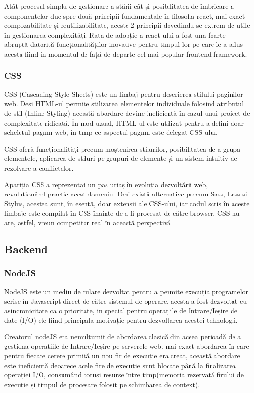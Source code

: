 \documentclass[12pt,a4paper,hidelinks]{report}
\theoremstyle{definition}
\theoremstyle{remark}
\begin{document}
Atât procesul simplu de gestionare a stării cât și
posibilitatea de îmbricare a componentelor duc spre două principii fundamentale în filosofia react,
mai exact compozabilitate și reutilizabilitate, aceste 2 principii dovedindu-se extrem de utile în gestionarea complexități.
Rata de adopție a react-ului a fost una foarte abruptă datorită funcționalităților inovative pentru timpul lor pe care le-a adus acesta
fiind în momentul de față de departe cel mai popular frontend framework.

\subsubsection{CSS}

CSS (Cascading Style Sheets) este un limbaj pentru descrierea stilului paginilor web. Deși HTML-ul permite stilizarea elementelor individuale folosind atributul de stil (Inline Styling) 
această abordare devine ineficientă în cazul unui proiect de complexitate ridicată. În mod uzual, HTML-ul este utilizat pentru a defini doar scheletul paginii web, 
în timp ce aspectul paginii este delegat CSS-ului. 

CSS oferă funcționalități precum moștenirea stilurilor, posibilitatea de a grupa elementele, aplicarea de stiluri pe grupuri de elemente și un sistem intuitiv de rezolvare a conflictelor. 

Apariția CSS a reprezentat un pas uriaș în evoluția dezvoltării web, revoluționând practic acest domeniu. Deși există alternative precum Sass, 
Less și Stylus, acestea sunt, în esență, doar extensii ale CSS-ului, iar codul scris în aceste limbaje este compilat în CSS înainte de a fi procesat de către browser. 
CSS nu are, astfel, vreun competitor real în această perspectivă

\subsection{Backend}
\subsubsection{NodeJS}
NodeJS\cite{3} este un mediu de rulare dezvoltat pentru a permite execuția programelor scrise în Javascript direct de către sistemul de operare, acesta a fost dezvoltat cu asincronicitate ca o prioritate,
in special pentru operațiile de Intrare/Ieșire de date (I/O) ele fiind principala motivație pentru dezvoltarea acestei tehnologii.

Creatorul nodeJS era nemulțumit de abordarea clasică din aceea perioadă de a gestiona operațiile de Intrare/Ieșire pe serverele web, mai exact abordarea în care pentru fiecare cerere primită un nou fir de execuție era creat, 
această abordare este ineficientă deoarece acele fire de execuție sunt blocate până la finalizarea operației I/O,
consumând totuși  resurse între timp(memoria rezervată firului de execuție și timpul de procesare folosit pe schimbarea de context). 
\end{document}
